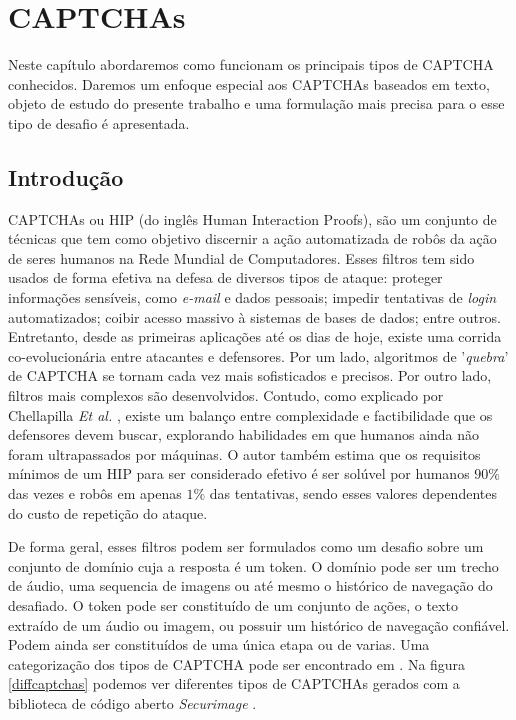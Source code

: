 \chapter{CAPTCHAs}\label{captchas}

Neste capítulo abordaremos como funcionam os principais tipos de CAPTCHA conhecidos. Daremos um enfoque especial aos CAPTCHAs baseados em texto, objeto de estudo do presente trabalho e uma formulação mais precisa para o esse tipo de desafio é apresentada.

\section{Introdução}

CAPTCHAs \cite{captcha2003} ou HIP \cite{lectures2005HIP} (do inglês Human Interaction Proofs), são um conjunto de técnicas que tem como objetivo discernir a ação automatizada de robôs da ação de seres humanos na Rede Mundial de Computadores. Esses filtros tem sido usados de forma efetiva na defesa de diversos tipos de ataque: proteger informações sensíveis, como \textit{e-mail} e dados pessoais; impedir tentativas de \textit{login} automatizados; coibir acesso massivo à sistemas de bases de dados; entre outros. Entretanto, desde as primeiras aplicações até os dias de hoje, existe uma corrida co-evolucionária entre atacantes e defensores. Por um lado, algoritmos de '\textit{quebra}' de CAPTCHA se  tornam cada vez mais sofisticados e precisos. Por outro lado, filtros mais complexos são desenvolvidos. Contudo, como explicado por Chellapilla \textit{Et al.} \cite{lectures2005HIP}, existe um balanço entre complexidade e factibilidade que os defensores devem buscar, explorando habilidades em que humanos ainda não foram ultrapassados por máquinas. O autor também estima que os requisitos mínimos de um HIP para ser considerado efetivo é ser solúvel por humanos $90\%$ das vezes e robôs  em apenas $1\%$ das tentativas, sendo esses valores dependentes do custo de repetição do ataque. 

De forma geral, esses filtros podem ser formulados como um desafio sobre um conjunto de domínio cuja a resposta é um token. O domínio pode ser um trecho de áudio, uma sequencia de imagens ou até mesmo o histórico de navegação do desafiado. O token pode ser constituído de um conjunto de ações, o texto extraído de um áudio ou imagem, ou possuir um histórico de navegação confiável. Podem ainda ser constituídos de uma única etapa ou de varias. Uma categorização dos tipos de CAPTCHA pode ser encontrado em \cite{singh2014survey}. Na figura \ref{diffcaptchas} podemos ver diferentes tipos de CAPTCHAs gerados com a biblioteca de código aberto \textit{Securimage} \cite{securimage}.

